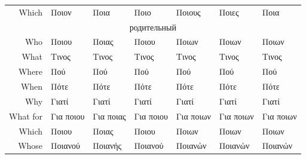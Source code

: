 \documentclass[12pt]{article}
\newcommand{\my}[1]{\textcolor{gray!80!white}{#1}}
\newenvironment{page}{\clearpage\normalsize\null\vfill}{\vfill\null}
\begin{document}
\begin{page}
\begin{tabular}{rllllll}
            \my{Which} & Ποιον & Ποια & Ποιο & Ποιους & Ποιες & Ποια\\[2mm]
            \multicolumn{7}{c}{родительный}\\[1mm]
        	\my{Who} & Ποιου & Ποιας & Ποιου & Ποιων & Ποιων & Ποιων\\
        	\my{What} & Τινος & Τινος & Τινος & Τινος & Τινος & Τινος\\
        	\my{Where} & Πού & Πού & Πού & Πού & Πού & Πού\\
        	\my{When} & Πότε & Πότε & Πότε & Πότε & Πότε & Πότε\\
        	\my{Why} & Γιατί & Γιατί & Γιατί & Γιατί & Γιατί & Γιατί\\
        	\my{What for} & Για ποιου & Για ποιας & Για ποιου & Για ποιων & Για ποιων & Για ποιων\\
        	\my{Which} & Ποιου & Ποιας & Ποιου & Ποιων & Ποιων & Ποιων\\
        	\my{Whose} & Ποιανού & Ποιανής & Ποιανού & Ποιανών & Ποιανών & Ποιανών\\
        \end{tabular}
    \end{page}
\end{document}
